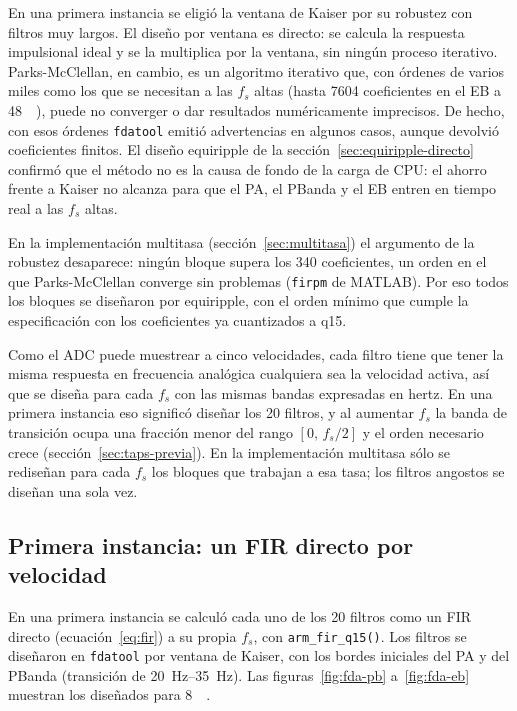 \documentclass[11pt,a4paper]{article}
\begin{document}
En una primera instancia se eligió la ventana de Kaiser por su robustez
con filtros muy largos. El diseño por ventana es directo: se calcula la
respuesta impulsional ideal y se la multiplica por la ventana, sin ningún
proceso iterativo. Parks-McClellan, en cambio, es un algoritmo iterativo que,
con órdenes de varios miles como los que se necesitan a las $f_s$ altas
(hasta \num{7604} coeficientes en el EB a \qty{48}{\kilo\sps}), puede no
converger o dar resultados numéricamente imprecisos. De hecho, con esos
órdenes \texttt{fdatool} emitió advertencias en algunos casos, aunque
devolvió coeficientes finitos. El diseño equiripple de la
sección~\ref{sec:equiripple-directo} confirmó que
el método no es la causa de fondo de la carga de CPU: el ahorro frente a
Kaiser no alcanza para que el PA, el PBanda y el EB entren en tiempo real a
las $f_s$ altas.

En la implementación multitasa (sección~\ref{sec:multitasa}) el argumento de
la robustez desaparece: ningún bloque supera los 340 coeficientes, un orden
en el que Parks-McClellan converge sin problemas (\texttt{firpm} de MATLAB).
Por eso todos los bloques se diseñaron por equiripple, con el orden mínimo
que cumple la especificación con los coeficientes ya cuantizados a q15.

Como el ADC puede muestrear a cinco velocidades, cada filtro tiene que tener
la misma respuesta en frecuencia analógica cualquiera sea la velocidad
activa, así que se diseña para cada $f_s$ con las mismas bandas expresadas
en hertz. En una primera instancia eso significó diseñar los 20 filtros,
y al aumentar $f_s$ la banda de transición ocupa una fracción menor del
rango $[0,\, f_s/2]$ y el orden necesario crece
(sección~\ref{sec:taps-previa}). En la implementación multitasa sólo se
rediseñan para cada $f_s$ los bloques que trabajan a esa tasa; los filtros
angostos se diseñan una sola vez.

\subsection{Primera instancia: un FIR directo por velocidad}\label{sec:previa}

En una primera instancia se calculó cada uno de los 20 filtros como un FIR
directo (ecuación~\eqref{eq:fir}) a su propia $f_s$, con
\texttt{arm\_fir\_q15()}. Los filtros se diseñaron en \texttt{fdatool} por
ventana de Kaiser, con los bordes iniciales del PA y del PBanda (transición
de \qtyrange{20}{35}{\hertz}). Las figuras~\ref{fig:fda-pb}
a~\ref{fig:fda-eb} muestran los diseñados para \qty{8}{\kilo\sps}.
\end{document}
